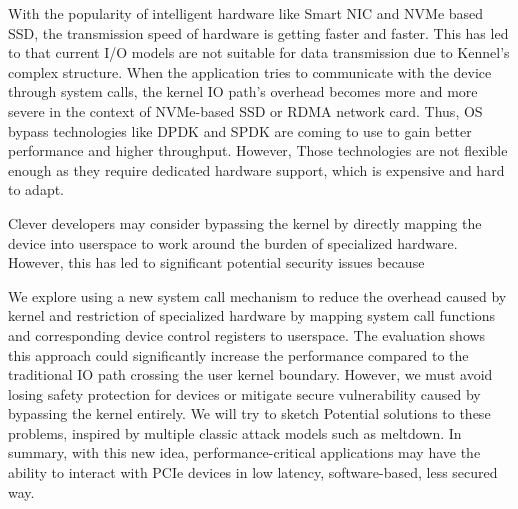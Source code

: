 




With the popularity of intelligent hardware like Smart NIC 
and NVMe based SSD, the transmission speed of hardware is getting faster and faster. 
This has led to that current I/O models are not suitable for data transmission due 
to Kennel's complex structure. When the application tries to communicate with 
the device through system calls, the kernel IO path's overhead becomes more and 
more severe in the context of NVMe-based SSD or RDMA network card. Thus, OS bypass 
technologies like DPDK and SPDK are coming to use to gain better performance 
and higher throughput. However, Those technologies are not flexible enough 
as they require dedicated hardware support, which is expensive and hard to adapt.

Clever developers may consider bypassing the kernel by directly 
mapping the device into userspace to work around the burden of 
specialized hardware. However, this has led to significant potential 
security issues because 

We explore using a new system call mechanism to reduce the overhead
 caused by kernel and restriction of specialized hardware by mapping 
 system call functions and corresponding device control registers to 
 userspace. The evaluation shows this approach could significantly 
 increase the performance compared to the traditional IO path crossing 
 the user kernel boundary. However, we must avoid losing safety protection 
 for devices or mitigate secure vulnerability caused by bypassing the kernel
  entirely. We will try to sketch Potential solutions to these problems, 
  inspired by multiple classic attack models such as meltdown. 
  In summary, with this new idea, performance-critical applications 
  may have the ability to interact with PCIe devices in low latency,
   software-based, less secured way.


